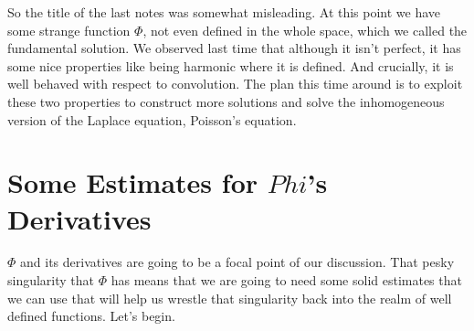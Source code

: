 \documentclass{bkcnotes}
\begin{document}
\maketitle

So the title of the last notes was somewhat misleading. At this point
we have some strange function $\Phi$, not even defined in the whole
space, which we called the fundamental solution. We observed last time
that although it isn't perfect, it has some nice properties like being
harmonic where it is defined. And crucially, it is well behaved with
respect to convolution. The plan this time around is to exploit these
two properties to construct more solutions and solve the inhomogeneous
version of the Laplace equation, Poisson's equation.

\section{Some Estimates for $Phi$'s Derivatives}
$\Phi$ and its derivatives are going to be a focal point of our
discussion. That pesky singularity that $\Phi$ has means that we are
going to need some solid estimates that we can use that will help us
wrestle that singularity back into the realm of well defined
functions. Let's begin.
\end{document}
